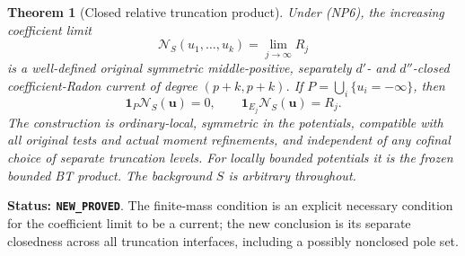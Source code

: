\documentclass[11pt,a4paper]{article}
\numberwithin{equation}{section}
\newtheorem{theorem}{Theorem}[section]
\theoremstyle{definition}
\theoremstyle{remark}
\begin{document}
\begin{theorem}[Closed relative truncation product]
\label{thm:r11-closed-nonpolar-product}
Under (NP6), the increasing coefficient limit
\[
 \mathcal N_S(u_1,\ldots,u_k)=\lim_{j\to\infty}R_j
 \tag{NP7}
\]
is a well-defined original symmetric middle-positive,
separately $d'$- and $d''$-closed coefficient-Radon current of degree
$(p+k,p+k)$.  If
$P=\bigcup_i\{u_i=-\infty\}$, then
\[
 \mathbf1_P\mathcal N_S(\mathbf u)=0,
 \qquad
 \mathbf1_{E_j}\mathcal N_S(\mathbf u)=R_j.
 \tag{NP8}
\]
The construction is ordinary-local, symmetric in the potentials,
compatible with all original tests and actual moment refinements,
and independent of any cofinal choice of separate truncation levels.
For locally bounded potentials it is the frozen bounded BT product.
The background $S$ is arbitrary throughout.
\end{theorem}

\noindent\textbf{Status: \texttt{NEW\_PROVED}}.  The finite-mass
condition is an explicit necessary condition for the coefficient limit
to be a current; the new conclusion is its separate closedness across
all truncation interfaces, including a possibly nonclosed pole set.
\end{document}
